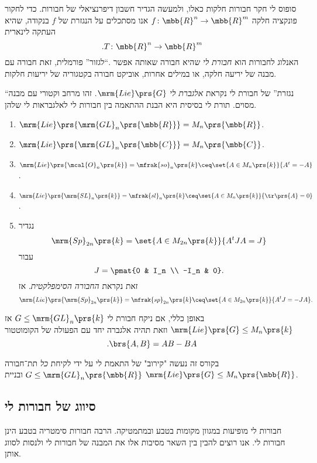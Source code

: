 \documentclass[10pt, twoside]{book}
\begin{document}
סופוס לי חקר חבורות חלקות כאלו, ולמעשה הגדיר חשבון דיפרנציאלי של חבורות.
כדי לחקור פונקציה חלקה
$f \colon \mbb{R}^n \to \mbb{R}^m$
אנו מסתכלים על הנגזרת של
$f$
בנקודה, שהיא העתקה לינארית
\[\text{.} T \colon \mbb{R}^n \to \mbb{R}^m\]
האנלוג לחבורות הוא
\emph{חבורת לי}
שהיא חבורה שאותה אפשר
.``לגזור''
פורמלית, זאת חבורה עם מבנה של יריעה חלקה, או במילים אחרות, אוביקט חבורה בקטגוריה של יריעות חלקות.

``נגזרת''
של חבורת לי נקראת
\emph{אלגברת לי}
$\mrm{Lie}\prs{G}$.
זהו מרחב וקטורי עם מבנה מסוים.
תורת לי בסיסית היא הבנת ההתאמה בין חבורות לי לאלגבראות לי שלהן.

\begin{examples*}
\enumthm
\begin{enumerate}
\item $\mrm{Lie}\prs{\mrm{GL}_n\prs{\mbb{R}}} = M_n\prs{\mbb{R}}$.
\item $\mrm{Lie}\prs{\mrm{GL}_n\prs{\mbb{C}}} = M_n\prs{\mbb{C}}$.
\item $\mrm{Lie}\prs{\mcal{O}_n\prs{k}} = \mfrak{so}_n\prs{k} \ceq \set{A \in M_n\prs{k}}{A^t = -A}$.
\item $\mrm{Lie}\prs{\mrm{SL}_n\prs{k}} = \mfrak{sl}_n\prs{k} \ceq \set{A \in M_n\prs{k}}{\tr\prs{A} = 0}$.
\item נגדיר
\[\mrm{Sp}_{2n}\prs{k} = \set{A \in M_{2n}\prs{k}}{A^t J A = J}\]
עבור
\[J = \pmat{0 & I_n \\ -I_n & 0} \text{.}\]
זאת נקראת
\emph{החבורה הסימפלקטית}.
אז
\[\mrm{Lie}\prs{\mrm{Sp}_{2n}\prs{k}} = \mfrak{sp}_{2n}\prs{k} \ceq \set{A \in M_{2n}\prs{k}}{A^tJ = -J A} \text{.}\]
\end{enumerate}
\end{examples*}

באופן כללי, אם ניקח חבורת לי
$G \leq \mrm{GL}_n\prs{k}$
אז
$\mrm{Lie}\prs{G} \leq M_n\prs{k}$
וזאת תהיה אלגברה יחד עם הפעולה של הקומוטטור
\[\text{.} \brs{A,B} = AB - BA\]

בקורס זה נעשה "קירוב" של התאמת לי על ידי לקיחת
\emph{כל}
תת־חבורה
$G \leq \mrm{GL}_n\prs{\mbb{R}}$
ובניית
$\mrm{Lie}\prs{G} \leq M_n\prs{\mbb{R}}$.

\subsection{סיווג של חבורות לי}

חבורות לי מופיעות במגוון מקומות בטבע ובמתמטיקה.
הרבה חבורות סימטריה בטבע הינן חבורות לי. אנו רוצים להבין בין השאר מסיבות אלו את המבנה של חבורות לי ולנסות לסווג אותן.
\end{document}
